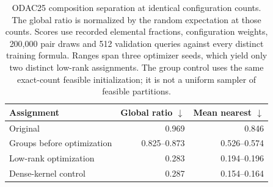 \begin{table}[htbp]\centering
\begin{tabular}{lrr}
\toprule
Assignment & Global ratio $\downarrow$ & Mean nearest $\downarrow$\\
\midrule
Original & 0.969 & 0.846\\
Groups before optimization & 0.825--0.873 & 0.526--0.574\\
Low-rank optimization & 0.283 & 0.194--0.196\\
Dense-kernel control & 0.287 & 0.154--0.164\\
\bottomrule\end{tabular}
\caption{ODAC25 composition separation at identical configuration counts. The global ratio is normalized by the random expectation at those counts. Scores use recorded elemental fractions, configuration weights, 200,000 pair draws and 512 validation queries against every distinct training formula. Ranges span three optimizer seeds, which yield only two distinct low-rank assignments. The group control uses the same exact-count feasible initialization; it is not a uniform sampler of feasible partitions.}
\label{tab:odac25}\end{table}
